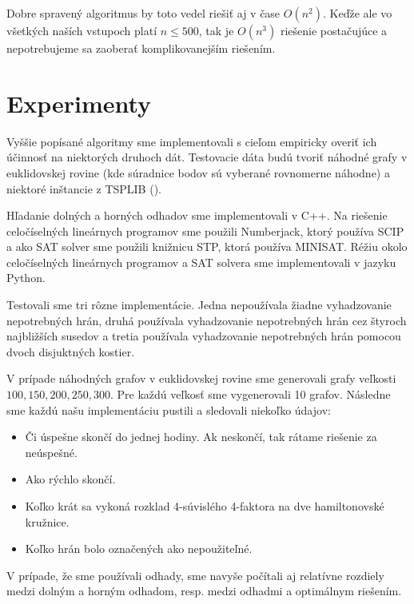 \begin{poznamka}
Dobre spravený algoritmus by toto vedel riešiť aj v čase $O(n^2)$. Keďže ale vo všetkých
naších vstupoch platí $n \leq 500$, tak je $O(n^3)$ riešenie postačujúce a nepotrebujeme sa zaoberať
komplikovanejším riešením.
\end{poznamka}

\section{Experimenty}

Vyššie popísané algoritmy sme implementovali s cieľom empiricky overiť ich účinnosť na
niektorých druhoch dát. Testovacie dáta budú tvoriť náhodné grafy v euklidovskej rovine (kde
súradnice bodov sú vyberané rovnomerne náhodne) a niektoré inštancie z TSPLIB (\cite{tsplib}).

Hľadanie dolných a horných odhadov sme implementovali v C++. Na riešenie celočíselných
lineárnych programov sme použili Numberjack, ktorý používa SCIP a ako SAT solver sme použili knižnicu STP, ktorá
používa MINISAT. Réžiu okolo celočíselných lineárnych programov a SAT solvera sme
implementovali v jazyku Python. 

Testovali sme tri rôzne implementácie. Jedna nepoužívala žiadne vyhadzovanie nepotrebných
hrán, druhá používala vyhadzovanie nepotrebných hrán cez štyroch najbližších susedov a tretia
používala vyhadzovanie nepotrebných hrán pomocou dvoch disjuktných kostier.

V prípade náhodných grafov v euklidovskej rovine sme generovali grafy veľkosti $100, 150, 200, 250,
300$. Pre každú veľkosť sme vygenerovali 10 grafov.
Následne sme každú našu implementáciu pustili a sledovali niekoľko údajov:
\begin{itemize}
\item Či úspešne skončí do jednej hodiny. Ak neskončí, tak rátame riešenie za neúspešné.
\item Ako rýchlo skončí.
\item Koľko krát sa vykoná rozklad 4-súvislého 4-faktora na dve hamiltonovské kružnice.
\item Koľko hrán bolo označených ako nepoužiteľné.
\end{itemize}

V prípade, že sme používali odhady, sme navyše počítali aj relatívne rozdiely
medzi dolným a horným odhadom, resp. medzi odhadmi a optimálnym riešením.
